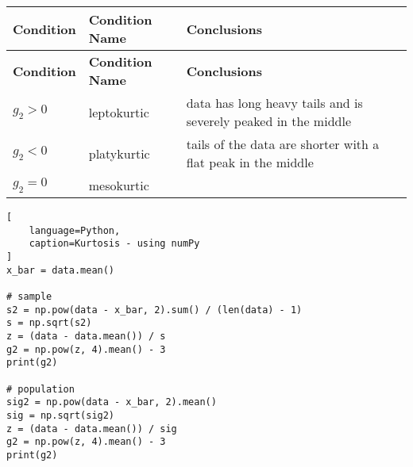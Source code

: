 \begin{longtable}{|l|l|p{10cm}|}
    \hline
    \textbf{Condition} & \textbf{Condition Name} & \textbf{Conclusions}\\ \hline
    \endfirsthead

    \hline
    \textbf{Condition} & \textbf{Condition Name} & \textbf{Conclusions}\\ \hline
    \endhead

    \hline

    $g_2 > 0$ & leptokurtic \label{Data/Describing Data/Central Tendency/Kurtosis/leptokurtic} & data has long heavy tails and is severely peaked in the middle \\ \hline

    $g_2 < 0$ & platykurtic \label{Data/Describing Data/Central Tendency/Kurtosis/platykurtic} & tails of the data are shorter with a flat peak in the middle \\ \hline

    $g_2 = 0$ & mesokurtic \label{Data/Describing Data/Central Tendency/Kurtosis/mesokurtic} &  \\ \hline
\end{longtable}

\begin{lstlisting}[
    language=Python,
    caption=Kurtosis - using numPy
]
x_bar = data.mean()

# sample
s2 = np.pow(data - x_bar, 2).sum() / (len(data) - 1)
s = np.sqrt(s2)
z = (data - data.mean()) / s
g2 = np.pow(z, 4).mean() - 3
print(g2)

# population
sig2 = np.pow(data - x_bar, 2).mean()
sig = np.sqrt(sig2)
z = (data - data.mean()) / sig
g2 = np.pow(z, 4).mean() - 3
print(g2)
\end{lstlisting}














